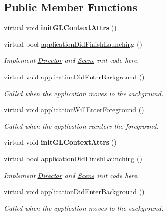 \subsection*{Public Member Functions}
\begin{DoxyCompactItemize}
\item 
\mbox{\label{classAppDelegate_a2de4e8ab7d04bde311684e1d4ceb2c0f}} 
virtual void {\bfseries init\+G\+L\+Context\+Attrs} ()
\item 
virtual bool \hyperlink{classAppDelegate_a68cbaed49edf7581dc59a09d5062fff3}{application\+Did\+Finish\+Launching} ()
\begin{DoxyCompactList}\small\item\em Implement \hyperlink{classDirector}{Director} and \hyperlink{classScene}{Scene} init code here. \end{DoxyCompactList}\item 
virtual void \hyperlink{classAppDelegate_a17cb09777419781698324e0415bffd3a}{application\+Did\+Enter\+Background} ()
\begin{DoxyCompactList}\small\item\em Called when the application moves to the background. \end{DoxyCompactList}\item 
virtual void \hyperlink{classAppDelegate_ac4d653e3f74a91efef5f2def58fe3108}{application\+Will\+Enter\+Foreground} ()
\begin{DoxyCompactList}\small\item\em Called when the application reenters the foreground. \end{DoxyCompactList}\item 
\mbox{\label{classAppDelegate_a8cebb62f1a76c1b912cf654ee49a7455}} 
virtual void {\bfseries init\+G\+L\+Context\+Attrs} ()
\item 
virtual bool \hyperlink{classAppDelegate_a05630e4484204b8e917ae7b8ac4bd6a3}{application\+Did\+Finish\+Launching} ()
\begin{DoxyCompactList}\small\item\em Implement \hyperlink{classDirector}{Director} and \hyperlink{classScene}{Scene} init code here. \end{DoxyCompactList}\item 
virtual void \hyperlink{classAppDelegate_a852ad7535f0df46885c2a36d3f17a0e8}{application\+Did\+Enter\+Background} ()
\begin{DoxyCompactList}\small\item\em Called when the application moves to the background. \end{DoxyCompactList}\item 

\end{DoxyCompactItemize}
